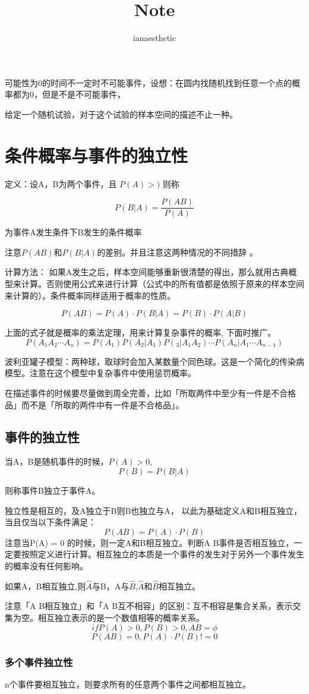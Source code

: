 \documentclass[10pt, a4paper]{article}
\title{Note}
\author{ianaesthetic}
\begin{document}
    \section{}
        可能性为0的时间不一定时不可能事件，设想：在圆内找随机找到任意一个点的概率都为0，但是不是不可能事件，

        给定一个随机试验，对于这个试验的样本空间的描述不止一种。    

    \section{条件概率与事件的独立性}
        定义：设A，B为两个事件，且 $P(A) > )$ 则称

        $$P(B|A) = \frac{P(AB)}{P(A)}$$
        
        为事件A发生条件下B发生的条件概率

        注意$P(AB)$和$P(B|A)$的差别。并且注意这两种情况的不同措辞 。 

        计算方法：
            如果A发生之后，样本空间能够重新很清楚的得出，那么就用古典概型来计算。否则使用公式来进行计算（公式中的所有值都是依照于原来的样本空间来计算的）。条件概率同样适用于概率的性质。

            $$P(AB) = P(A) \cdot P(B|A) = P(B) \cdot P(A|B)$$ 

            上面的式子就是概率的乘法定理，用来计算复杂事件的概率,  下面时推广。   
            $$P(A_1A_2\cdots A_n) = P(A_1)P(A_2|A_1)P(_3|A_1A_2)\cdots P(A_n|A_1\cdots A_{n-1})$$

            波利亚罐子模型：两种球，取球时会加入某数量个同色球。这是一个简化的传染病模型。注意在这个模型中复杂事件中使用惩罚概率。 

            在描述事件的时候要尽量做到周全完善，比如「所取两件中至少有一件是不合格品」而不是「所取的两件中有一件是不合格品」。
            \subsection{事件的独立性}
                当A，B是随机事件的时候，$P(A) > 0$, 
                $$P(B) = P(B|A)$$
                
                则称事件B独立于事件A。

                独立性是相互的，及A独立于B则B也独立与A， 以此为基础定义A和B相互独立，当且仅当以下条件满足：
                    $$P(AB) = P(A) \cdot P(B)$$
                注意当P(A) = 0 的时候，则一定A和B相互独立。判断A B事件是否相互独立，一定要按照定义进行计算。相互独立的本质是一个事件的发生对于另外一个事件发生的概率没有任何影响。

                如果A，B相互独立,则$\hat{A}$与B，A与$\hat{B}$,$\hat{A}$和$\hat{B}$相互独立。

                注意「A B相互独立」和「A B互不相容」的区别：互不相容是集合关系，表示交集为空。相互独立表示的是一个数值相等的概率关系。
                    $$if P(A) > 0, P(B) > 0, AB = \phi$$
                    $$P(AB) = 0, P(A) \cdot P(B) != 0$$ 
                \subsubsection{多个事件独立性}
                    n个事件要相互独立，则要求所有的任意两个事件之间都相互独立。
\end{document}
